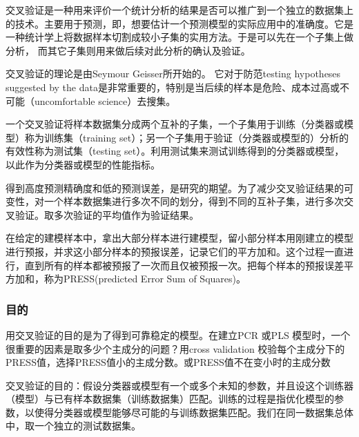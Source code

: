 \documentclass[10pt,a4paper]{ctexbook}
\begin{document}
交叉验证是一种用来评价一个统计分析的结果是否可以推广到一个独立的数据集上的技术。主要用于预测，即，想要估计一个预测模型的实际应用中的准确度。它是一种统计学上将数据样本切割成较小子集的实用方法。于是可以先在一个子集上做分析， 而其它子集则用来做后续对此分析的确认及验证。 

交叉验证的理论是由Seymour Geisser所开始的。 它对于防范testing hypotheses suggested by the data是非常重要的，特别是当后续的样本是危险、成本过高或不可能（uncomfortable science）去搜集。

一个交叉验证将样本数据集分成两个互补的子集，一个子集用于训练（分类器或模型）称为训练集（training set）；另一个子集用于验证（分类器或模型的）分析的有效性称为测试集（testing set）。利用测试集来测试训练得到的分类器或模型，以此作为分类器或模型的性能指标。

得到高度预测精确度和低的预测误差，是研究的期望。为了减少交叉验证结果的可变性，对一个样本数据集进行多次不同的划分，得到不同的互补子集，进行多次交叉验证。取多次验证的平均值作为验证结果。

在给定的建模样本中，拿出大部分样本进行建模型，留小部分样本用刚建立的模型进行预报，并求这小部分样本的预报误差，记录它们的平方加和。这个过程一直进行，直到所有的样本都被预报了一次而且仅被预报一次。把每个样本的预报误差平方加和，称为PRESS(predicted Error Sum of Squares)。

\subsubsection{目的}
用交叉验证的目的是为了得到可靠稳定的模型。在建立PCR 或PLS 模型时，一个很重要的因素是取多少个主成分的问题？用cross validation 校验每个主成分下的PRESS值，选择PRESS值小的主成分数。或PRESS值不在变小时的主成分数

交叉验证的目的：假设分类器或模型有一个或多个未知的参数，并且设这个训练器（模型）与已有样本数据集（训练数据集）匹配。训练的过程是指优化模型的参数，以使得分类器或模型能够尽可能的与训练数据集匹配。我们在同一数据集总体中，取一个独立的测试数据集。
\end{document}
